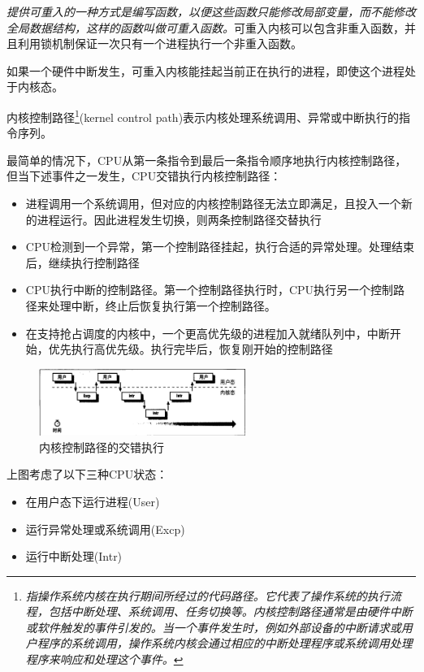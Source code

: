     \emph{提供可重入的一种方式是编写函数，以便这些函数只能修改局部变量，而不能修改全局数据结构，这样的函数叫做可重入函数。}可重入内核可以包含非重入函数，并且利用锁机制保证一次只有一个进程执行一个非重入函数。

    如果一个硬件中断发生，可重入内核能挂起当前正在执行的进程，即使这个进程处于内核态。

    内核控制路径\footnote[2]{\emph{指操作系统内核在执行期间所经过的代码路径。它代表了操作系统的执行流程，包括中断处理、系统调用、任务切换等。内核控制路径通常是由硬件中断或软件触发的事件引发的。当一个事件发生时，例如外部设备的中断请求或用户程序的系统调用，操作系统内核会通过相应的中断处理程序或系统调用处理程序来响应和处理这个事件。}}(kernel control path)表示内核处理系统调用、异常或中断执行的指令序列。

    最简单的情况下，CPU从第一条指令到最后一条指令顺序地执行内核控制路径，但当下述事件之一发生，CPU交错执行内核控制路径：

\begin{itemize}
    \item 进程调用一个系统调用，但对应的内核控制路径无法立即满足，且投入一个新的进程运行。因此进程发生切换，则两条控制路径交替执行
    \item CPU检测到一个异常，第一个控制路径挂起，执行合适的异常处理。处理结束后，继续执行控制路径
    \item CPU执行中断的控制路径。第一个控制路径执行时，CPU执行另一个控制路径来处理中断，终止后恢复执行第一个控制路径。
    \item 在支持抢占调度的内核中，一个更高优先级的进程加入就绪队列中，中断开始，优先执行高优先级。执行完毕后，恢复刚开始的控制路径
\end{itemize}

\begin{figure}[!htbp]
    \centering
    \includegraphics[width=0.6\textwidth]{image/chapter01/内核控制路径.png}
    \caption{内核控制路径的交错执行}
\end{figure}

    上图考虑了以下三种CPU状态：

\begin{itemize}
    \item 在用户态下运行进程(User)
    \item 运行异常处理或系统调用(Excp)
    \item 运行中断处理(Intr)
\end{itemize}

